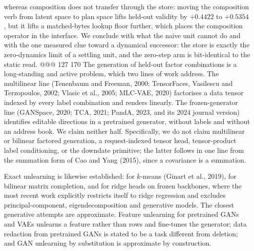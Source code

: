 whereas composition does not transfer through the store: moving the composition verb from
latent space to plan space lifts held-out validity by $+0.4422$ to $+0.5354$, but it lifts a
matched-bytes lookup floor further, which places the composition operator in the interface.
We conclude with what the naive unit cannot do and with the one measured clue toward a
dynamical successor: the store is exactly the zero-dynamics limit of a settling unit, and
the zero-step arm is bit-identical to the static read. %
@@@ 127 170
The generation of held-out factor combinations is a long-standing and active problem, which
two lines of work address. The multilinear line (Tenenbaum and Freeman, 2000; TensorFaces,
Vasilescu and Terzopoulos, 2002; Vlasic et al., 2005; MLC-VAE, 2020) factorises a data tensor
indexed by every label combination and renders linearly. The frozen-generator line (GANSpace,
2020; TCA, 2021; PandA, 2023, and its 2024 journal version) identifies editable directions in a
pretrained generator, without labels and without an address book. We claim neither half.
Specifically, we do not claim multilinear or bilinear factored generation, a request-indexed
tensor head, tensor-product label conditioning, or the downdate primitive; the latter follows
in one line from the summation form of Cao and Yang (2015), since a covariance is a summation.

Exact unlearning is likewise established: for $k$-means (Ginart et al., 2019), for bilinear
matrix completion, and for ridge heads on frozen backbones, where the most recent work
explicitly restricts itself to ridge regression and excludes principal-component,
eigendecomposition and generative models. The closest generative attempts are approximate.
Feature unlearning for pretrained GANs and VAEs unlearns a feature rather than rows and
fine-tunes the generator; data redaction from pretrained GANs is stated to be a task different
from deletion; and GAN unlearning by substitution is approximate by construction.

